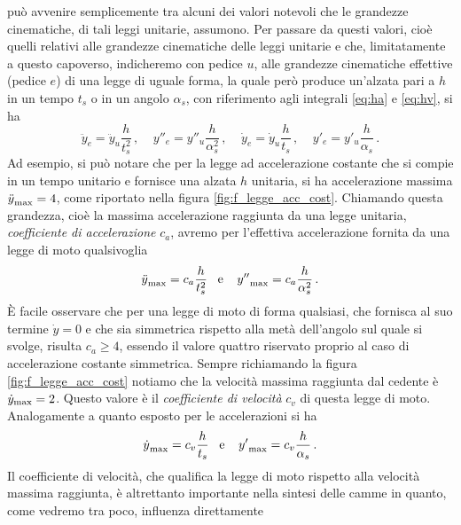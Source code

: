 pu\`o avvenire semplicemente tra
alcuni dei valori notevoli che le grandezze cinematiche, di tali leggi
unitarie, assumono. Per passare da questi valori, cio\`e quelli
relativi alle grandezze cinematiche delle leggi unitarie e che,
limitatamente a questo capoverso, indicheremo
con pedice $u$, alle grandezze cinematiche effettive (pedice $e$) di una legge
 di uguale forma,
la quale per\`o produce un'alzata pari a $h$ in un tempo $t_s$ o in un angolo
$\alpha_s$, con riferimento agli integrali
\ref{eq:ha} e \ref{eq:hv}, si ha
\begin{equation}
\ddot y_e = \ddot y_u \frac{h}{t_s^2}\,,\;\;\;\;
{y''_e} = {y''_u} \frac{h}{\alpha_s^2}\,,\;\;\;\;
\dot y_e = \dot y_u \frac{h}{t_s}\,,\;\;\;\;
{y'_e} = {y'_u} \frac{h}{\alpha_s}\,.
\end{equation}
\noindent Ad esempio, si pu\`o notare che per la legge
ad accelerazione costante che si compie in un tempo unitario e fornisce
una alzata $h$ unitaria, si ha accelerazione massima ${{}\ddot {y}}_{\rm max}=4$,
come riportato nella figura \ref{fig:f_legge_acc_cost}.
Chiamando questa grandezza, cio\`e la massima accelerazione raggiunta
da una legge unitaria, {\em coefficiente di accelerazione} $c_a$, avremo per l'effettiva accelerazione
fornita da una legge di moto qualsivoglia
\begin{equation}
{{}\ddot{y}}_{\rm max}= c_a {h\over t_s^2}\;\;\; {\rm e}\;\;\;\;  
{{y''}}_{\rm max}= c_a {h\over \alpha_s^2}\,.  
\label{e_ca}
\end{equation}
\noindent \`E facile osservare che per una legge di moto di forma qualsiasi,
che fornisca
al suo termine $\dot {y}=0$ e che sia simmetrica rispetto alla met\`a dell'angolo sul quale si svolge, risulta $c_a \geq 4$, essendo il valore quattro
riservato proprio al caso di accelerazione costante simmetrica.
Sempre richiamando la figura \ref{fig:f_legge_acc_cost} notiamo che la velocit\`a
massima raggiunta dal cedente \`e $\dot {y}_{\rm max}=2$. Questo valore
\`e il {\em coefficiente di velocit\`a}
 $c_v$ di questa legge di moto. 
Analogamente a quanto esposto per le accelerazioni si ha
\begin{equation}
{{}\dot{y}}_{\rm max}= c_v {h\over t_s}\;\;\; {\rm e}\;\;\;\;  
{{y'}}_{\rm max}= c_v {h\over \alpha_s}\,.  
\label{e_cv}
\end{equation}
\noindent Il coefficiente di velocit\`a, che qualifica la legge di moto rispetto
alla velocit\`a massima raggiunta, \`e altrettanto importante nella sintesi
delle camme in quanto, come vedremo tra poco, influenza direttamente
